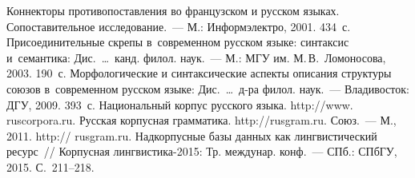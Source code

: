 \vspace*{6pt}


 \begin{multicols}{2}

\renewcommand{\bibname}{\protect\rmfamily Литература}

{\small\frenchspacing
{%
\begin{thebibliography}{99}


Коннекторы противопоставления во французском и русском языках. 
Сопоставительное исследование.~--- М.: Информэлектро, 2001. 434~с.
 Присоединительные скрепы в~современном русском языке: 
синтаксис и~семантика: Дис.\ \ldots\ канд. филол. наук.~--- М.: МГУ им. 
М.\,В.~Ломоносова, 2003. 190~с.
Морфологические и синтаксические аспекты описания структуры союзов 
в~современном русском языке: Дис.\ \ldots\ д-ра филол. наук.~--- 
Владивосток: ДГУ, 2009. 393~с.
Национальный корпус русского языка. {\sf http://www. ruscorpora.ru}.
Русская корпусная грамматика. {\sf http://rusgram.ru}.
 Союз.~--- М., 2011. 
{\sf http:// rusgram.ru}. %
Надкорпусные базы данных как лингвистический ресурс~// Корпусная лингвистика-2015: 
Тр. междунар. конф.~--- СПб.: СПбГУ, 2015. С.~211--218.


\end{thebibliography}}}
\end{multicols}
